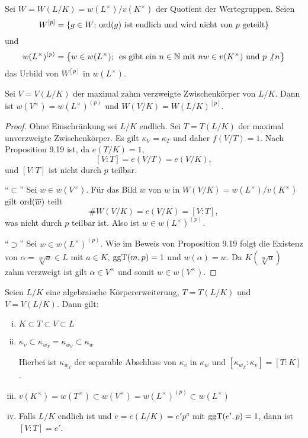 \begin{defi}
	Sei $W=W(L/K)= w(L^\times) / v(K^\times)$ der Quotient der Wertegruppen. Seien
	\[ W^{[p]} = \left\{ g \in W; \, \operatorname{ord}(g) \text{ ist endlich und wird nicht von $p$ geteilt}   \right\}
	\]
	und
	\[ w(L^\times)^{(p)} = \left\{  w \in w(L^\times); \, \text{ es gibt ein $n\in\mathbb{N}$ mit $nw \in v(K^\times)$ und $p\not| \, n$} \right\}
	\]
	das Urbild von $W^{[p]}$ in $w(L^\times)$.
\end{defi}

\begin{Prop}
	Sei $V=V(L/K)$ der maximal zahm verzweigte Zwischenkörper von $L/K$. Dann ist 
	$w(V^\times)=w(L^\times)^{(p)}$ und $W(V/K) = W(L/K)^{[p]}$.
\end{Prop}

\begin{proof}
	Ohne Einschränkung sei $L/K$ endlich. Sei $T=T(L/K)$ der maximal unverzweigte Zwischenkörper. Es gilt $\kappa_V = \kappa_T$ und daher $f(V/T)=1$. Nach Proposition 9.19 ist, da $e(T/K)=1$,
	\[ [V:T] = e(V/T) = e(V/K),
	\]
	und $[V:T]$ ist nicht durch $p$ teilbar.
	
	\bigskip \enquote{$\subset$} Sei $w \in w(V^\times)$. Für das Bild $\overline{w}$ von $w$ in
	$W(V/K)= w(L^\times) / v(K^\times)$ gilt $\operatorname{ord}(\overline{w})$ teilt
	\[ \# W(V/K) = e(V/K) = [V:T],
	\]
	was nicht durch $p$ teilbar ist. Also ist $w \in w(L^\times)^{(p)}$.
	
	\bigskip \enquote{$\supset$} Sei $w \in w(L^\times)^{(p)}$. Wie im Beweis von Proposition 9.19 folgt die Existenz von $\alpha = \sqrt[m]{a} \in L$ mit $a\in K$, $\operatorname{ggT}(m,p) = 1$ und $w(\alpha) = w$. Da $K\left( \sqrt[m]{a} \right)$ zahm verzweigt ist gilt $\alpha \in V^\times$ und somit $w\in w(V^\times)$.
\end{proof}


\begin{Kor}
	Seien $L/K$ eine algebraische Körpererweiterung, $T=T(L/K)$ und $V=V(L/K)$. Dann gilt:
	\begin{enumerate}[(i)]
		\item $K \subset T \subset V \subset L$
		\item $\kappa_v \subset \kappa_{w_T} = \kappa_{w_V} \subset \kappa_w$
		
		Hierbei ist $\kappa_{w_T}$ der separable Abschluss von $\kappa_v$ in $\kappa_w$ und 
		$[\kappa_{w_T}: \kappa_v] = [T:K]$.
		\item $v(K^\times) = w(T^\times) \subset w(V^\times) 
		= w(L^\times)^{(p)} \subset w(L^\times)$
		\item Falls $L/K$ endlich ist und $e=e(L/K)=e'p^a$ mit $\operatorname{ggT}(e',p)=1$, dann ist $[V:T] = e'$.
	\end{enumerate}
\end{Kor}

